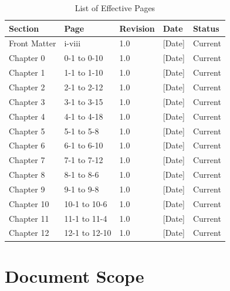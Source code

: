 \documentclass[12pt,a4paper,twoside,openright]{book}
\newcommand{\tabletextfont}{\normalfont\rmfamily}
\newcommand{\tableheadfont}{\normalfont\bfseries}
\begin{document}
\begin{table}[h]
\centering
\setlength{\tabcolsep}{4pt} %
\begin{tabular}{|p{}|p{}|p{}|p{}|p{}|}
\hline
\tableheadfont\textbf{Section} & \tableheadfont\textbf{Page} & \tableheadfont\textbf{Revision} & \tableheadfont\textbf{Date} & \tableheadfont\textbf{Status} \\
\hline
\tabletextfont Front Matter & i-viii & 1.0 & {\color{missingred}[Date]} & Current \\
\hline
\tabletextfont Chapter 0 & 0-1 to 0-10 & 1.0 & {\color{missingred}[Date]} & Current \\
\hline
\tabletextfont Chapter 1 & 1-1 to 1-10 & 1.0 & {\color{missingred}[Date]} & Current \\
\hline
\tabletextfont Chapter 2 & 2-1 to 2-12 & 1.0 & {\color{missingred}[Date]} & Current \\
\hline
\tabletextfont Chapter 3 & 3-1 to 3-15 & 1.0 & {\color{missingred}[Date]} & Current \\
\hline
\tabletextfont Chapter 4 & 4-1 to 4-18 & 1.0 & {\color{missingred}[Date]} & Current \\
\hline
\tabletextfont Chapter 5 & 5-1 to 5-8 & 1.0 & {\color{missingred}[Date]} & Current \\
\hline
\tabletextfont Chapter 6 & 6-1 to 6-10 & 1.0 & {\color{missingred}[Date]} & Current \\
\hline
\tabletextfont Chapter 7 & 7-1 to 7-12 & 1.0 & {\color{missingred}[Date]} & Current \\
\hline
\tabletextfont Chapter 8 & 8-1 to 8-6 & 1.0 & {\color{missingred}[Date]} & Current \\
\hline
\tabletextfont Chapter 9 & 9-1 to 9-8 & 1.0 & {\color{missingred}[Date]} & Current \\
\hline
\tabletextfont Chapter 10 & 10-1 to 10-6 & 1.0 & {\color{missingred}[Date]} & Current \\
\hline
\tabletextfont Chapter 11 & 11-1 to 11-4 & 1.0 & {\color{missingred}[Date]} & Current \\
\hline
\tabletextfont Chapter 12 & 12-1 to 12-10 & 1.0 & {\color{missingred}[Date]} & Current \\
\hline
\end{tabular}
\caption{List of Effective Pages}
\end{table}

\section{Document Scope}
\end{document}

